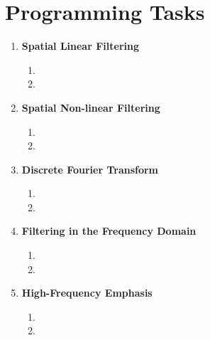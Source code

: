 \documentclass[12pt,a4paper]{article}
\begin{document}
	\section{Programming Tasks}
	\begin{enumerate}
		\item \textbf{Spatial Linear Filtering}
		\begin{enumerate}
			\item 
			\item
		\end{enumerate}

		\item \textbf{Spatial Non-linear Filtering}
		\begin{enumerate}
			\item 
			\item
		\end{enumerate}

		\item \textbf{Discrete Fourier Transform}
		\begin{enumerate}
			\item 
			\item
		\end{enumerate}

		\item \textbf{Filtering in the Frequency Domain}
		\begin{enumerate}
			\item 
			\item
		\end{enumerate}

		\item \textbf{High-Frequency Emphasis}
		\begin{enumerate}
			\item 
			\item
		\end{enumerate}
	\end{enumerate}
		
\end{document}
